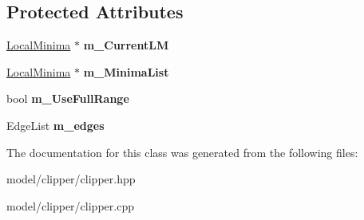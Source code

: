 \subsection*{Protected Attributes}
\begin{DoxyCompactItemize}
\item 
\hypertarget{classClipperLib_1_1ClipperBase_a4e3039382d3c8ec6f9ab434021be8d43}{\hyperlink{structClipperLib_1_1LocalMinima}{Local\-Minima} $\ast$ {\bfseries m\-\_\-\-Current\-L\-M}}\label{classClipperLib_1_1ClipperBase_a4e3039382d3c8ec6f9ab434021be8d43}

\item 
\hypertarget{classClipperLib_1_1ClipperBase_a74df45b228436fa0243b53cc00192a5f}{\hyperlink{structClipperLib_1_1LocalMinima}{Local\-Minima} $\ast$ {\bfseries m\-\_\-\-Minima\-List}}\label{classClipperLib_1_1ClipperBase_a74df45b228436fa0243b53cc00192a5f}

\item 
\hypertarget{classClipperLib_1_1ClipperBase_aea11d183617adc12d7ba2b84533f7f45}{bool {\bfseries m\-\_\-\-Use\-Full\-Range}}\label{classClipperLib_1_1ClipperBase_aea11d183617adc12d7ba2b84533f7f45}

\item 
\hypertarget{classClipperLib_1_1ClipperBase_a8bfc007c0c0afd4e9d252dac0ef5daa0}{Edge\-List {\bfseries m\-\_\-edges}}\label{classClipperLib_1_1ClipperBase_a8bfc007c0c0afd4e9d252dac0ef5daa0}

\end{DoxyCompactItemize}


The documentation for this class was generated from the following files\-:\begin{DoxyCompactItemize}
\item 
model/clipper/clipper.\-hpp\item 
model/clipper/clipper.\-cpp\end{DoxyCompactItemize}
